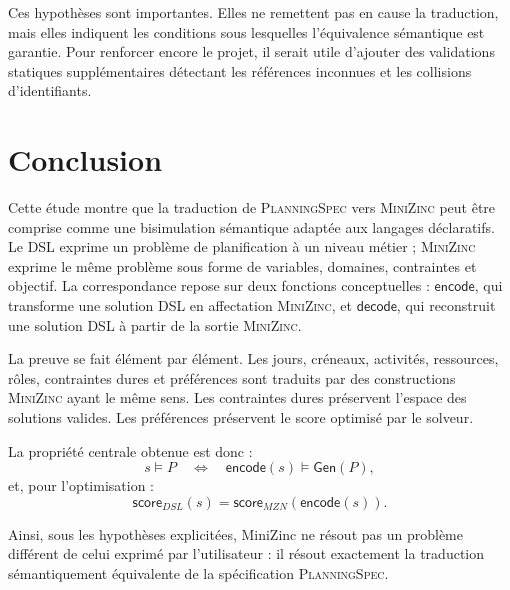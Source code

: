 \documentclass[12pt,a4paper]{article}
\newcommand{\DSL}{\textsc{PlanningSpec}}
\newcommand{\MZN}{\textsc{MiniZinc}}
\newcommand{\encode}{\mathsf{encode}}
\newcommand{\decode}{\mathsf{decode}}
\newcommand{\gen}{\mathsf{Gen}}
\newcommand{\scoreDSL}{\mathsf{score}_{DSL}}
\newcommand{\scoreMZN}{\mathsf{score}_{MZN}}
\begin{document}
Ces hypothèses sont importantes. Elles ne remettent pas en cause la traduction, mais elles indiquent les conditions sous lesquelles l'équivalence sémantique est garantie. Pour renforcer encore le projet, il serait utile d'ajouter des validations statiques supplémentaires détectant les références inconnues et les collisions d'identifiants.

\section{Conclusion}

Cette étude montre que la traduction de \DSL{} vers \MZN{} peut être comprise comme une bisimulation sémantique adaptée aux langages déclaratifs. Le DSL exprime un problème de planification à un niveau métier ; \MZN{} exprime le même problème sous forme de variables, domaines, contraintes et objectif. La correspondance repose sur deux fonctions conceptuelles : $\encode$, qui transforme une solution DSL en affectation \MZN{}, et $\decode$, qui reconstruit une solution DSL à partir de la sortie \MZN{}.

La preuve se fait élément par élément. Les jours, créneaux, activités, ressources, rôles, contraintes dures et préférences sont traduits par des constructions \MZN{} ayant le même sens. Les contraintes dures préservent l'espace des solutions valides. Les préférences préservent le score optimisé par le solveur.

La propriété centrale obtenue est donc :
\[
s \models P \quad \Longleftrightarrow \quad \encode(s) \models \gen(P),
\]
et, pour l'optimisation :
\[
\scoreDSL(s) = \scoreMZN(\encode(s)).
\]

Ainsi, sous les hypothèses explicitées, MiniZinc ne résout pas un problème différent de celui exprimé par l'utilisateur : il résout exactement la traduction sémantiquement équivalente de la spécification \DSL{}.
\end{document}
